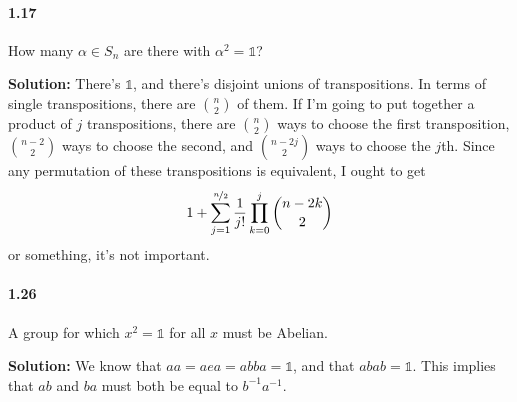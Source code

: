 \documentclass[12pt,a4paper]{article}
\providecommand{\id}{\mathbb{1}}
\providecommand{\soln}{\textbf{Solution: }}
\providecommand{\inv}{^{-1}}
\begin{document}
\paragraph*{1.17}
How many $\alpha \in S_n$ are there with $\alpha^2 = \id$?

\soln There's $\id$, and there's disjoint unions of transpositions. 
In terms of single transpositions, there are ${n \choose 2}$ of them. 
If I'm going to put together a product of $j$ transpositions, there are ${n \choose 2}$ ways to choose the first transposition, ${{n-2} \choose 2}$ ways to choose the second, and ${{n-2j} \choose 2}$ ways to choose the $j$th. Since any permutation of these transpositions is equivalent, I ought to get
\begin{equation*}
1 + \sum_{j=1}^{\nicefrac{n}{2}} \dfrac{1}{j!} \prod_{k=0}^{j} {{n-2k} \choose 2}
\end{equation*}
or something, it's not important.

\paragraph*{1.26}
A group for which $x^2=\id$ for all $x$ must be Abelian.

\soln We know that $aa = aea = abba = \id$, and that $abab = \id$. 
This implies that $ab$ and $ba$ must both be equal to $b\inv a\inv$. 
\end{document}
